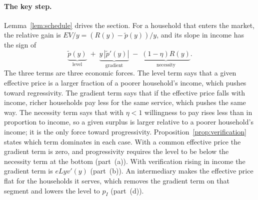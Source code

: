\documentclass[12pt]{article}
\theoremstyle{remark}
\begin{document}
\paragraph{The key step.} Lemma~\ref{lem:schedule} drives the section. For a household that enters the market, the relative gain is $EV/y=(R(y)-\tilde p(y))/y$, and its slope in income has the sign of
\[
\underbrace{\tilde p(y)}_{\text{level}}\;+\;\underbrace{y\,|\tilde p'(y)|}_{\text{gradient}}\;-\;\underbrace{(1-\eta)R(y)}_{\text{necessity}} .
\]
The three terms are three economic forces. The level term says that a given effective price is a larger fraction of a poorer household's income, which pushes toward regressivity. The gradient term says that if the effective price falls with income, richer households pay less for the same service, which pushes the same way. The necessity term says that with $\eta<1$ willingness to pay rises less than in proportion to income, so a given surplus is larger relative to a poorer household's income; it is the only force toward progressivity. Proposition~\ref{prop:verification} states which term dominates in each case. With a common effective price the gradient term is zero, and progressivity requires the level to be below the necessity term at the bottom (part~(a)). With verification rising in income the gradient term is $eLyv'(y)$ (part~(b)). An intermediary makes the effective price flat for the households it serves, which removes the gradient term on that segment and lowers the level to $p_I$ (part~(d)).
\end{document}
